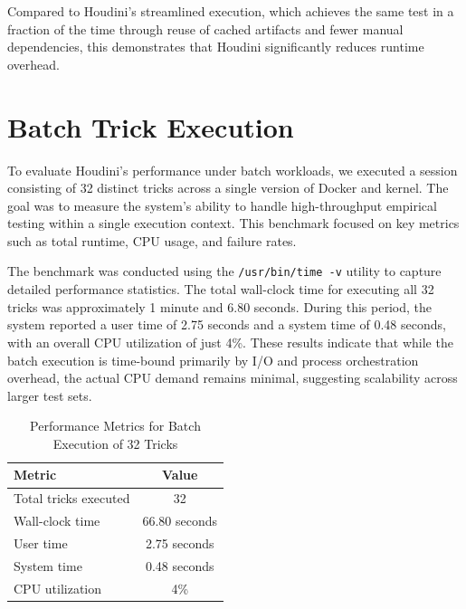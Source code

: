\documentclass[12pt]{report}
\begin{document}
\begin{doublespace}
Compared to Houdini’s streamlined execution, which achieves the same test in a fraction of the time through reuse of cached artifacts and fewer manual dependencies, this demonstrates that Houdini significantly reduces runtime overhead.


\section{Batch Trick Execution}

To evaluate Houdini’s performance under batch workloads, we executed a session consisting of 32 distinct tricks across a single version of Docker and kernel. The goal was to measure the system's ability to handle high-throughput empirical testing within a single execution context. This benchmark focused on key metrics such as total runtime, CPU usage, and failure rates.

The benchmark was conducted using the \texttt{/usr/bin/time -v} utility to capture detailed performance statistics. The total wall-clock time for executing all 32 tricks was approximately 1 minute and 6.80 seconds. During this period, the system reported a user time of 2.75 seconds and a system time of 0.48 seconds, with an overall CPU utilization of just 4\%. These results indicate that while the batch execution is time-bound primarily by I/O and process orchestration overhead, the actual CPU demand remains minimal, suggesting scalability across larger test sets.

\begin{table}[ht]
\centering
\caption{Performance Metrics for Batch Execution of 32 Tricks}
\label{tab:batch-execution}
\begin{tabular}{|l|c|}
\hline
\textbf{Metric}         & \textbf{Value} \\
\hline
Total tricks executed   & 32 \\
Wall-clock time         & 66.80 seconds \\
User time               & 2.75 seconds \\
System time             & 0.48 seconds \\
CPU utilization         & 4\% \\
\hline
\end{tabular}
\end{table}




















\end{doublespace}
\end{document}
